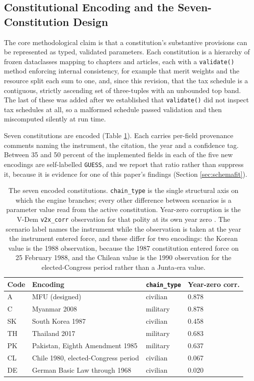 \documentclass{ieeeaccess}
\begin{document}
\subsection{Constitutional Encoding and the Seven-Constitution Design}
\label{sec:encoding}
The core methodological claim is that a constitution's substantive
provisions can be represented as typed, validated parameters. Each
constitution is a hierarchy of frozen dataclasses mapping to chapters
and articles, each with a \texttt{validate()} method enforcing internal
consistency, for example that merit weights and the resource split each
sum to one, and, since this revision, that the tax schedule is a
contiguous, strictly ascending set of three-tuples with an unbounded top
band. The last of these was added after we established that
\texttt{validate()} did not inspect tax schedules at all, so a malformed
schedule passed validation and then miscomputed silently at run time.

Seven constitutions are encoded (Table \ref{tab:scenarios}). Each
carries per-field provenance comments naming the instrument, the
citation, the year and a confidence tag. Between 35 and 50 percent of
the implemented fields in each of the five new encodings are
self-labelled \texttt{GUESS}, and we report that ratio rather than
suppress it, because it is evidence for one of this paper's findings
(Section \ref{sec:schemafit}).

\begin{table}[!t]
\caption{The seven encoded constitutions. \texttt{chain\_type} is the
single structural axis on which the engine branches; every other
difference between scenarios is a parameter value read from the active
constitution. Year-zero corruption is the V-Dem \texttt{v2x\_corr}
observation for that polity at its own year zero
\cite{coppedge2026vdem16}. The scenario label names the instrument while
the observation is taken at the year the instrument entered force, and
these differ for two encodings: the Korean value is the 1988
observation, because the 1987 constitution entered force on 25 February
1988, and the Chilean value is the 1990 observation for the
elected-Congress period rather than a Junta-era value.}
\label{tab:scenarios}
\centering
\small
\begin{tabular}{@{}llll@{}}
\toprule
Code & Encoding & \texttt{chain\_type} & Year-zero corr. \\
\midrule
A  & MFU (designed)                      & civilian & 0.878 \\
C  & Myanmar 2008                        & military & 0.878 \\
SK & South Korea 1987                    & civilian & 0.458 \\
TH & Thailand 2017                       & military & 0.683 \\
PK & Pakistan, Eighth Amendment 1985     & military & 0.637 \\
CL & Chile 1980, elected-Congress period & civilian & 0.067 \\
DE & German Basic Law through 1968       & civilian & 0.020 \\
\bottomrule
\end{tabular}
\end{table}
\end{document}
